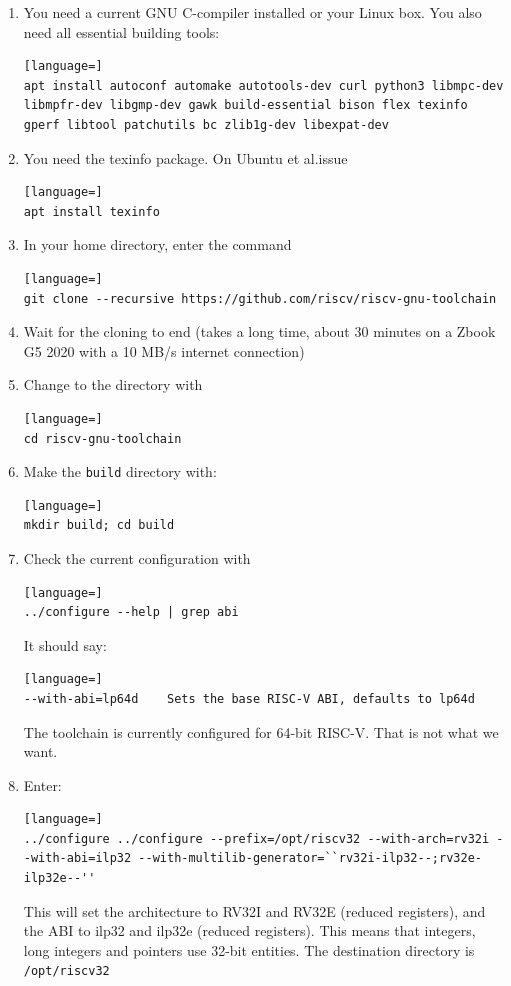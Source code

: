 \documentclass[12pt]{article}
\begin{document}
\begin{enumerate}
\item You need a current GNU C-compiler installed or your Linux box. You also need all essential building tools:
\begin{lstlisting}[language=]
apt install autoconf automake autotools-dev curl python3 libmpc-dev libmpfr-dev libgmp-dev gawk build-essential bison flex texinfo gperf libtool patchutils bc zlib1g-dev libexpat-dev
\end{lstlisting}
\item You need the texinfo package. On Ubuntu et al.\@ issue
\begin{lstlisting}[language=]
apt install texinfo
\end{lstlisting}
\item In your home directory, enter the command
\begin{lstlisting}[language=]
git clone --recursive https://github.com/riscv/riscv-gnu-toolchain
\end{lstlisting}
\item Wait for the cloning to end (takes a long time, about 30 minutes on a Zbook G5 2020 with a 10 MB/s internet connection)
\item Change to the directory with
\begin{lstlisting}[language=]
cd riscv-gnu-toolchain
\end{lstlisting}
\item Make the \texttt{build} directory with:
\begin{lstlisting}[language=]
mkdir build; cd build
\end{lstlisting}
\item Check the current configuration with
\begin{lstlisting}[language=]
../configure --help | grep abi
\end{lstlisting}
      It should say:
\begin{lstlisting}[language=]
--with-abi=lp64d    Sets the base RISC-V ABI, defaults to lp64d
\end{lstlisting}
The toolchain is currently configured for 64-bit RISC-V. That is not what we want.
\item Enter:
\begin{lstlisting}[language=]
../configure ../configure --prefix=/opt/riscv32 --with-arch=rv32i --with-abi=ilp32 --with-multilib-generator=``rv32i-ilp32--;rv32e-ilp32e--''
\end{lstlisting}
This will set the architecture to RV32I and RV32E (reduced registers), and the ABI to ilp32 and ilp32e (reduced registers). This means that integers, long integers and pointers use 32-bit entities. The destination directory is \lstinline|/opt/riscv32|

\end{enumerate}
\end{document}

